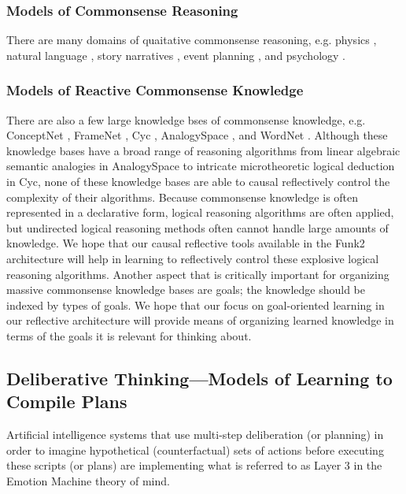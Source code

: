 \subsubsection{Models of Commonsense Reasoning}

There are many domains of quaitative commonsense reasoning, e.g. physics \cite[]{forbus:1994}, natural language \cite[]{liu:2004b}, story narratives \cite[]{williams:2005}, event planning \cite[]{smith:2006}, and psychology \cite[]{gordon:2008}.

\subsubsection{Models of Reactive Commonsense Knowledge}

There are also a few large knowledge bses of commonsense knowledge, e.g. ConceptNet \cite[]{liu:2004a}, FrameNet \cite[]{baker:1998}, Cyc \cite[]{lenat:1990}, AnalogySpace \cite[]{speer:2009}, and WordNet \cite[]{fellbaum:1998}.
Although these knowledge bases have a broad range of reasoning algorithms from linear algebraic semantic analogies in AnalogySpace to intricate microtheoretic logical deduction in Cyc, none of these knowledge bases are able to causal reflectively control the complexity of their algorithms.
Because commonsense knowledge is often represented in a declarative form, logical reasoning algorithms are often applied, but undirected logical reasoning methods often cannot handle large amounts of knowledge.
We hope that our causal reflective tools available in the Funk2 architecture will help in learning to reflectively control these explosive logical reasoning algorithms.
Another aspect that is critically important for organizing massive commonsense knowledge bases are goals; the knowledge should be indexed by types of goals.
We hope that our focus on goal-oriented learning in our reflective architecture will provide means of organizing learned knowledge in terms of the goals it is relevant for thinking about.

\subsection{Deliberative Thinking---Models of Learning to Compile Plans}

Artificial intelligence systems that use multi-step deliberation (or planning) in order to imagine hypothetical (counterfactual) sets of actions before executing these scripts (or plans) are implementing what is referred to as Layer 3 in the Emotion Machine theory of mind.

